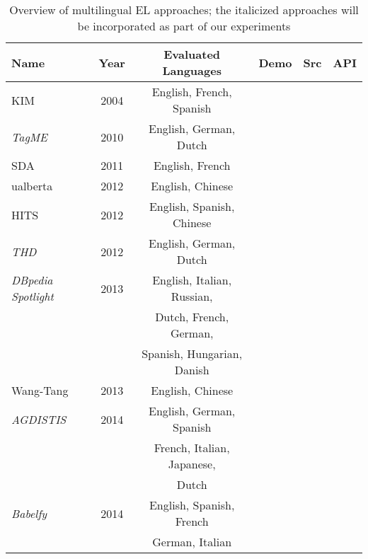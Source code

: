 \documentclass{llncs}
\newcommand{\cmark}{\ding{51}}%
\newcommand{\xmark}{\ding{55}}%
\begin{document}
\begin{table}[t]
	\centering
	\caption{Overview of multilingual EL approaches; the italicized approaches will be incorporated as part of our experiments}
	\label{tab:multilingual_approaches}
	\setlength{\tabcolsep}{3pt}
	\begin{tabular}{lccccr}
		\toprule
		\textbf{Name} &  \textbf{Year} & \textbf{Evaluated Languages} & \textbf{Demo} & \textbf{Src} & \textbf{API}\\ \midrule
		
		KIM \cite{KIM-popov2004kim} & 2004 &English, French, Spanish&\cmark&\xmark&\cmark\\\midrule
        
        \textit{TagME} \cite{ferragina2010tagme} & 2010 & English, German, Dutch &\cmark&\xmark&\cmark\\\midrule
		
		SDA \cite{SDA-charton2011automatic}  & 2011 &English, French&\xmark&\xmark&\xmark\\\midrule
		
		ualberta \cite{guo2012ualberta}& 2012 &English, Chinese&\xmark&\xmark&\xmark\\\midrule
		
		HITS \cite{fahrni2012hits} & 2012 & English, Spanish, Chinese&\xmark&\xmark&\xmark\\\midrule
		
		\textit{THD} \cite{THD-dojchinovski2012recognizing}  & 2012 &English, German, Dutch&\cmark&\cmark&\cmark\\\midrule 
		
		\textit{DBpedia Spotlight} \cite{mendes2011dbpedia,daiber2013improving} & 2013  &English, Italian, Russian,&\cmark&\cmark&\cmark\\
		& &Dutch, French, German,&&&\\
		& &Spanish, Hungarian, Danish&&&\\\midrule
		
		Wang-Tang \cite{wang2013boosting} & 2013 & English, Chinese&\xmark&\xmark&\xmark\\\midrule
		
		\textit{AGDISTIS} \cite{usbeck2014agdistis,mag2017}& 2014 & English, German, Spanish&\cmark&\cmark&\cmark\\
		& &French, Italian, Japanese,&&&\\
		& &Dutch&&&\\\midrule
		
		\textit{Babelfy} \cite{Babelfy-moro2014entity}& 2014 &English, Spanish, French &\cmark&\xmark&\cmark\\
		& &German, Italian&&&\\\midrule
		

\end{tabular}
\end{table}
\end{document}
